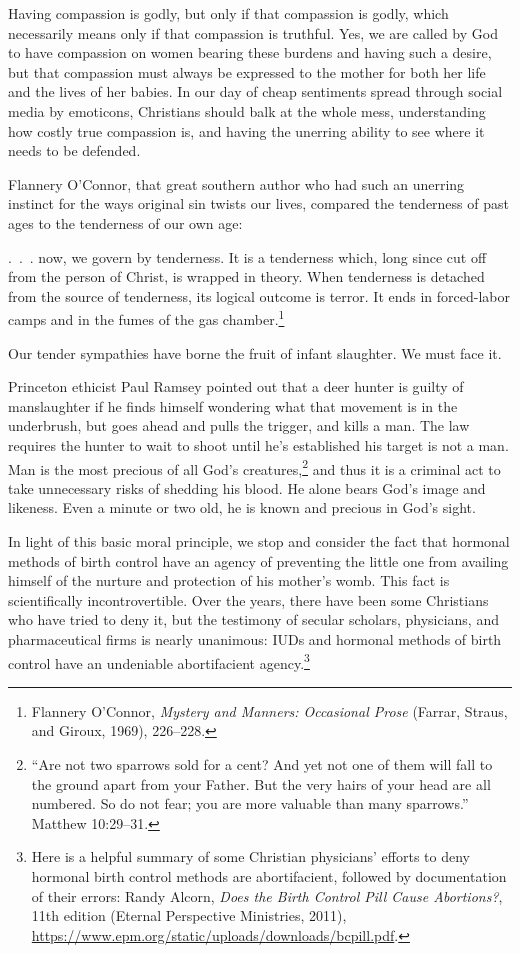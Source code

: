 \documentclass[
]{book}
\begin{document}
Having compassion is godly, but only if that compassion is godly, which necessarily means only if that compassion is truthful. Yes, we are called by God to have compassion on women bearing these burdens and having such a desire, but that compassion must always be expressed to the mother for both her life and the lives of her babies. In our day of cheap sentiments spread through social media by emoticons, Christians should balk at the whole mess, understanding how costly true compassion is, and having the unerring ability to see where it needs to be defended.

Flannery O'Connor, that great southern author who had such an unerring instinct for the ways original sin twists our lives, compared the tenderness of past ages to the tenderness of our own age:

.~.~. now, we govern by tenderness. It is a tenderness which, long since cut off from the person of Christ, is wrapped in theory. When tenderness is detached from the source of tenderness, its logical outcome is terror. It ends in forced-labor camps and in the fumes of the gas chamber.\footnote{Flannery O'Connor, \emph{Mystery and Manners: Occasional Prose} (Farrar, Straus, and Giroux, 1969), 226--228.}

Our tender sympathies have borne the fruit of infant slaughter. We must face it.

Princeton ethicist Paul Ramsey pointed out that a deer hunter is guilty of manslaughter if he finds himself wondering what that movement is in the underbrush, but goes ahead and pulls the trigger, and kills a man. The law requires the hunter to wait to shoot until he's established his target is not a man. Man is the most precious of all God's creatures,\footnote{``Are not two sparrows sold for a cent? And yet not one of them will fall to the ground apart from your Father. But the very hairs of your head are all numbered. So do not fear; you are more valuable than many sparrows.'' Matthew 10:29--31.} and thus it is a criminal act to take unnecessary risks of shedding his blood. He alone bears God's image and likeness. Even a minute or two old, he is known and precious in God's sight.

In light of this basic moral principle, we stop and consider the fact that hormonal methods of birth control have an agency of preventing the little one from availing himself of the nurture and protection of his mother's womb. This fact is scientifically incontrovertible. Over the years, there have been some Christians who have tried to deny it, but the testimony of secular scholars, physicians, and pharmaceutical firms is nearly unanimous: IUDs and hormonal methods of birth control have an undeniable abortifacient agency.\footnote{Here is a helpful summary of some Christian physicians' efforts to deny hormonal birth control methods are abortifacient, followed by documentation of their errors: Randy Alcorn, \emph{Does the Birth Control Pill Cause Abortions?}, 11th edition (Eternal Perspective Ministries, 2011), \url{https://www.epm.org/static/uploads/downloads/bcpill.pdf}.}
\end{document}
